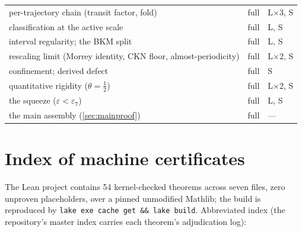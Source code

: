 \documentclass[11pt,letterpaper]{amsart}
\theoremstyle{definition}
\theoremstyle{remark}
\begin{document}
{\begin{longtable}{@{}>{\raggedright\arraybackslash}p{}ll@{}}
per-trajectory chain (transit factor, fold) & full & L$\times$3, S \\
classification at the active scale & full & L, S \\
interval regularity; the BKM split & full & L, S \\
rescaling limit (Morrey identity, CKN floor, almost-periodicity) & full & L$\times$2, S \\
confinement; derived defect & full & S \\
quantitative rigidity ($\theta=\tfrac12$) & full & L$\times$2, S \\
the squeeze ($\varepsilon<\varepsilon_7$) & full & L, S \\
the main assembly (\cref{sec:mainproof}) & full & --- \\
\bottomrule
\end{longtable}}

\section{Index of machine certificates}\label{app:certificates}

The Lean project contains 54 kernel-checked theorems across seven files, zero
unproven placeholders, over a pinned unmodified Mathlib; the build is reproduced by
\texttt{lake exe cache get \&\& lake build}. Abbreviated index (the repository's
master index carries each theorem's adjudication log):
\end{document}
